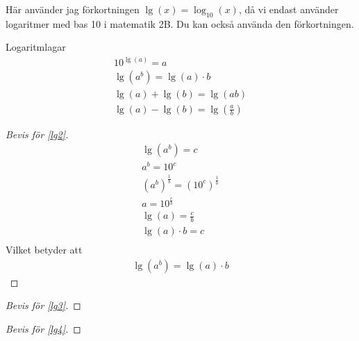 Här använder jag förkortningen $\lg(x) = \log_{10}(x)$, då vi endast använder logaritmer med bas 10 i matematik 2B. Du kan också använda den förkortningen.

\begin{theorem}{Logaritmlagar}
	\begin{align}
	10^{\lg(a)}=a \\
	\lg(a^b) = \lg(a)\cdot b \label{lg2} \\
	\lg(a)+\lg(b) = \lg(ab) \label{lg3} \\
	\lg(a)-\lg(b) = \lg\left(\frac{a}{b}\right) \label{lg4}
\end{align} 
\end{theorem}	

\begin{proof}[Bevis för \eqref{lg2}]
	\begin{align}
		\lg(a^b) = c \\ 
		a^b = 10^c \\
		(a^b)^{\frac{1}{b}} = (10^c)^{\frac{1}{b}} \\
		a = 10^{\frac{c}{b}} \\
		\lg(a) = \frac{c}{b} \\
		\lg(a)\cdot b = c \\
	\end{align}
	Vilket betyder att
	\begin{align}
		\lg(a^b) = \lg(a)\cdot b
	\end{align}
\end{proof}

\begin{proof}[Bevis för \eqref{lg3}]
	
\end{proof}

\begin{proof}[Bevis för \eqref{lg4}]
	
\end{proof}










































































